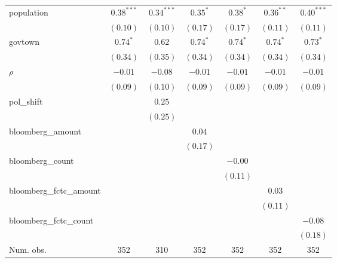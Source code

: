 \begin{table}[!h]
\begin{center}
\begin{tabular}{l c c c c c c }
population              & $0.38^{***}$ & $0.34^{***}$ & $0.35^{*}$   & $0.38^{*}$   & $0.36^{**}$  & $0.40^{***}$ \\
                        & $(0.10)$     & $(0.10)$     & $(0.17)$     & $(0.17)$     & $(0.11)$     & $(0.11)$     \\
govtown                 & $0.74^{*}$   & $0.62$       & $0.74^{*}$   & $0.74^{*}$   & $0.74^{*}$   & $0.73^{*}$   \\
                        & $(0.34)$     & $(0.35)$     & $(0.34)$     & $(0.34)$     & $(0.34)$     & $(0.34)$     \\
$\rho$                  & $-0.01$      & $-0.08$      & $-0.01$      & $-0.01$      & $-0.01$      & $-0.01$      \\
                        & $(0.09)$     & $(0.10)$     & $(0.09)$     & $(0.09)$     & $(0.09)$     & $(0.09)$     \\
pol\_shift              &              & $0.25$       &              &              &              &              \\
                        &              & $(0.25)$     &              &              &              &              \\
bloomberg\_amount       &              &              & $0.04$       &              &              &              \\
                        &              &              & $(0.17)$     &              &              &              \\
bloomberg\_count        &              &              &              & $-0.00$      &              &              \\
                        &              &              &              & $(0.11)$     &              &              \\
bloomberg\_fctc\_amount &              &              &              &              & $0.03$       &              \\
                        &              &              &              &              & $(0.11)$     &              \\
bloomberg\_fctc\_count  &              &              &              &              &              & $-0.08$      \\
                        &              &              &              &              &              & $(0.18)$     \\
\midrule
Num. obs.               & 352          & 310          & 352          & 352          & 352          & 352          \\

\end{tabular}
\end{center}
\end{table}
